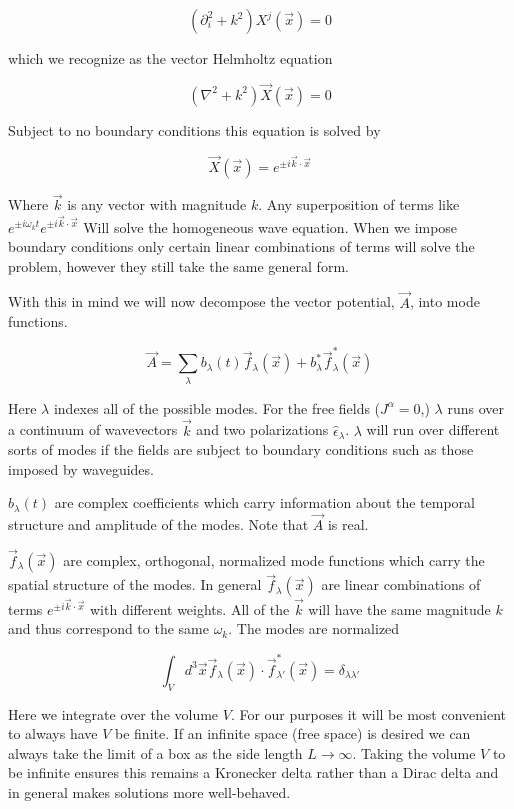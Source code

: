 \documentclass[12pt]{article}
\begin{document}
\[(\partial_i^2 + k^2)X^j(\vec{x}) = 0\]

which we recognize as the vector Helmholtz equation

\[ (\nabla^2 + k^2) \vec{X}(\vec{x}) = 0 \]

Subject to no boundary conditions this equation is solved by 

\[ \vec{X}(\vec{x}) = e^{\pm i \vec{k} \cdot \vec{x}} \]

Where $\vec{k}$ is any vector with magnitude $k$.
Any superposition of terms like $e^{\pm i \omega_k t}e^{\pm i \vec{k} \cdot \vec{x}}$ Will solve the homogeneous wave equation.
When we impose boundary conditions only certain linear combinations of terms will solve the problem, however they still take the same general form.

With this in mind we will now decompose the vector potential, $\vec{A}$, into mode functions.

\[ \vec{A} = \sum_{\lambda} b_{\lambda}(t) \vec{f}_{\lambda}(\vec{x}) + b_{\lambda}^* \vec{f}_{\lambda}^*(\vec{x}) \]

Here $\lambda$ indexes all of the possible modes.
For the free fields ($J^{\alpha}=0$,) $\lambda$ runs over a continuum of wavevectors $\vec{k}$ and two polarizations $\hat{\epsilon}_{\lambda}$.
$\lambda$ will run over different sorts of modes if the fields are subject to boundary conditions such as those imposed by waveguides.

$b_{\lambda}(t)$ are complex coefficients which carry information about the temporal structure and amplitude of the modes.
Note that $\vec{A}$ is real.

$\vec{f}_{\lambda}(\vec{x})$ are complex, orthogonal, normalized mode functions which carry the spatial structure of the modes. 
In general $\vec{f}_{\lambda}(\vec{x})$ are linear combinations of terms $e^{\pm i \vec{k} \cdot \vec{x}}$ with different weights.
All of the $\vec{k}$ will have the same magnitude $k$ and thus correspond to the same $\omega_k$.
The modes are normalized

\[\int_V d^3\vec{x} \vec{f}_{\lambda}(\vec{x}) \cdot \vec{f}_{\lambda'}^*(\vec{x}) = \delta_{\lambda \lambda'} \]

Here we integrate over the volume $V$.
For our purposes it will be most convenient to always have $V$ be finite.
If an infinite space (free space) is desired we can always take the limit of a box as the side length $L\rightarrow \infty$.
Taking the volume $V$ to be infinite ensures this remains a Kronecker delta rather than a Dirac delta and in general makes solutions more well-behaved.
\end{document}

